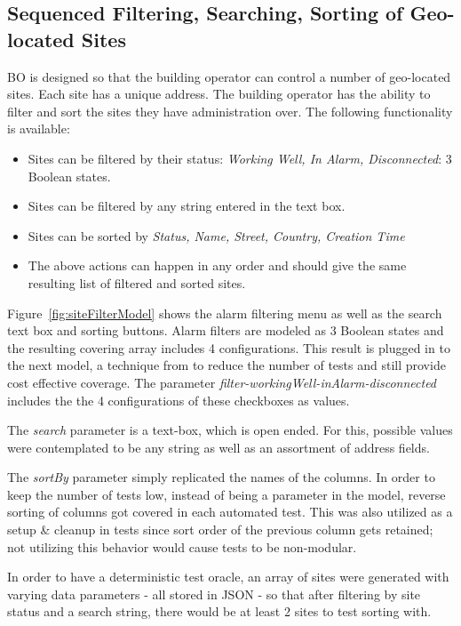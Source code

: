 \documentclass[conference]{IEEEtran}
\begin{document}
	\subsection{Sequenced Filtering, Searching, Sorting of Geo-located Sites}

	BO is designed so that the building operator can control a number of geo-located sites. 
	Each site has a unique address. The building operator has the ability to filter and sort the sites they have administration over.
	The following functionality is available:
	\begin{itemize}
		\item Sites can be filtered by their status: \textit{Working Well, In Alarm, Disconnected}: 3 Boolean states.
		\item Sites can be filtered by any string entered in the text box.
		\item Sites can be sorted by \textit{Status, Name, Street, Country, Creation Time}
		\item The above actions can happen in any order and should give the same resulting list of filtered and sorted sites.
	\end{itemize}

	Figure~\ref{fig:siteFilterModel} shows the alarm filtering menu as well as the search text box and sorting buttons. 
	Alarm filters are modeled as 3 Boolean states and the resulting covering array includes 4 configurations. 
	This result is plugged in to the next model, a technique from \cite{ozcan2017applications} to reduce the number of tests and still provide cost effective coverage.
	The parameter \textit{filter-workingWell-inAlarm-disconnected} includes the the 4 configurations of these checkboxes as values. 

	The \textit{search} parameter is a text-box, which is open ended. For this, possible values were contemplated to be any string as well as an assortment of address fields.

	The \textit{sortBy} parameter simply replicated the names of the columns. 
	In order to keep the number of tests low, instead of being a parameter in the model, reverse sorting of columns got covered in each automated test.
	This was also utilized as a setup \& cleanup in tests since sort order of the previous column gets retained; not utilizing this behavior  would cause tests to be non-modular.

	In order to have a deterministic test oracle, an array of sites were generated with varying data parameters - all stored in JSON - so that after filtering by site status and a search string, there would be at least 2 sites to test sorting with.
	
\end{document}
